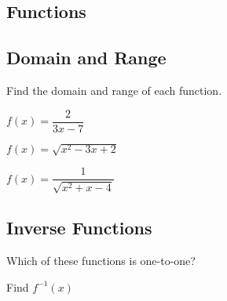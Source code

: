 \documentclass[fleqn,addpoints]{exam}
\begin{document}
\begin{questions}
\section{Functions}

\subsection{Domain and Range}
Find the domain and range of each function.

\question $f(x) = \dfrac{2}{3x-7}$

\question $f(x) = \sqrt{x^2-3x+2}$

\question $f(x) = \dfrac{1}{\sqrt{x^2+x-4}}$

\subsection{Inverse Functions}

\question
Which of these functions is one-to-one?

\question Find $f^{-1}(x)$
\end{questions}
\end{document}
